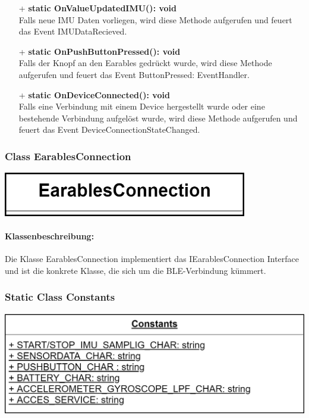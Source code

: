 \documentclass[a4paper,12pt]{article}
\begin{document}
\begin{itemize}
	\item[+] \textbf{static OnValueUpdatedIMU(): void}\\Falls neue IMU Daten vorliegen, wird diese Methode aufgerufen und feuert das Event IMUDataRecieved.
	\item[+] \textbf{static OnPushButtonPressed(): void}\\ Falls der Knopf an den \Gls{Earables} gedrückt wurde, wird diese Methode aufgerufen und feuert das Event ButtonPressed: EventHandler.
	\item[+] \textbf{static OnDeviceConnected(): void}\\ Falls eine Verbindung mit einem Device hergestellt wurde oder eine bestehende Verbindung aufgelöst wurde, wird diese Methode aufgerufen und feuert das Event DeviceConnectionStateChanged.
\end{itemize}



\begin{minipage}[b]{0.5\textwidth}
	\subsubsection{Class EarablesConnection}
	
	\end{minipage}
	\begin{minipage}[c]{0.5\textwidth}
	\includegraphics[width=0.8\textwidth]{bilder/BibPackageKlassen/EarablesConnection.png}
\end{minipage}

\paragraph{Klassenbeschreibung:}
Die Klasse EarablesConnection implementiert das IEarablesConnection Interface und ist die konkrete Klasse, die sich um die BLE-Verbindung kümmert.\\


\begin{minipage}[b]{0.5\textwidth}
	\subsubsection{Static Class Constants}
	
	\end{minipage}
	\begin{minipage}[c]{0.5\textwidth}
	\includegraphics[width=1.4\textwidth]{bilder/BibPackageKlassen/Constants.png}
\end{minipage}
\end{document}
